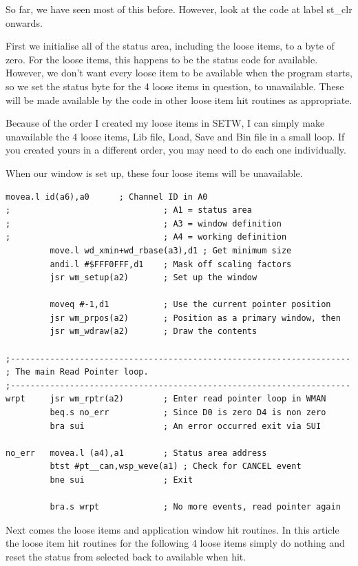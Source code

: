 So far, we have seen most of this before. However, look at the code
    at label st\_clr onwards.

First we initialise all of the status area, including the loose
    items, to a byte of zero. For the loose items, this happens to be the
    status code for available. However, we don't want every loose item to be
    available when the program starts, so we set the status byte for the 4
    loose items in question, to unavailable. These will be made available by
    the code in other loose item hit routines as appropriate.

Because of the order I created my loose items in
 SETW, I can simply make unavailable the 4 loose
    items, Lib file, Load, Save and Bin file in a small loop. If you
    created yours in a different order, you may need to do each one
    individually.

When our window is set up, these four loose items will be
    unavailable.

\begin{lstlisting}[firstnumber=last,caption={LibGen\_asm - Part 2}]
         movea.l id(a6),a0      ; Channel ID in A0
;                               ; A1 = status area
;                               ; A3 = window definition
;                               ; A4 = working definition
         move.l wd_xmin+wd_rbase(a3),d1 ; Get minimum size
         andi.l #$FFF0FFF,d1    ; Mask off scaling factors
         jsr wm_setup(a2)       ; Set up the window

         moveq #-1,d1           ; Use the current pointer position
         jsr wm_prpos(a2)       ; Position as a primary window, then
         jsr wm_wdraw(a2)       ; Draw the contents

;---------------------------------------------------------------------
; The main Read Pointer loop.
;---------------------------------------------------------------------
wrpt     jsr wm_rptr(a2)        ; Enter read pointer loop in WMAN
         beq.s no_err           ; Since D0 is zero D4 is non zero
         bra sui                ; An error occurred exit via SUI

no_err   movea.l (a4),a1        ; Status area address
         btst #pt__can,wsp_weve(a1) ; Check for CANCEL event
         bne sui                ; Exit

         bra.s wrpt             ; No more events, read pointer again
\end{lstlisting}

Next comes the loose items and application window hit routines. In
    this article the loose item hit routines for the following 4 loose items
    simply do nothing and reset the status from selected back to available
    when hit.


